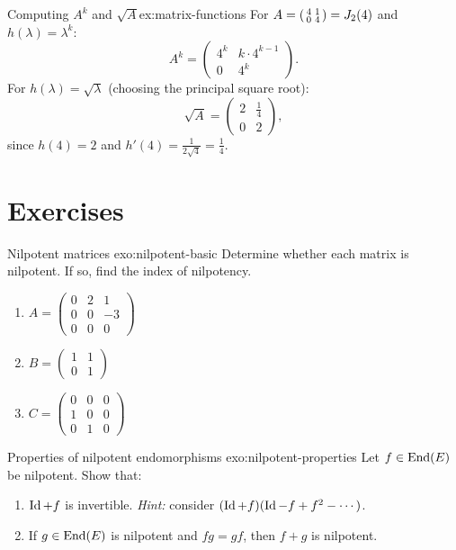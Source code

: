 \begin{example}{Computing $A^k$ and $\sqrt{A}$}{ex:matrix-functions}
For $A = \begin{psmallmatrix} 4 & 1 \\ 0 & 4 \end{psmallmatrix}
= J_2(4)$ and $h(\lambda) = \lambda^k$:
\[
  A^k = \begin{pmatrix} 4^k & k\cdot 4^{k-1} \\ 0 & 4^k
  \end{pmatrix}.
\]
For $h(\lambda) = \sqrt{\lambda}$ (choosing the principal square root):
\[
  \sqrt{A} = \begin{pmatrix} 2 & \tfrac{1}{4} \\ 0 & 2
  \end{pmatrix},
\]
since $h(4) = 2$ and $h'(4) = \frac{1}{2\sqrt{4}} = \frac{1}{4}$.
\end{example}


\section{Exercises}\label{sec:jordan-exercises}

\begin{exercise}{Nilpotent matrices \basic}{exo:nilpotent-basic}
Determine whether each matrix is nilpotent.  If so, find the index of
nilpotency.
\begin{enumerate}[label=(\alph*)]
  \item $A = \begin{pmatrix} 0 & 2 & 1 \\ 0 & 0 & -3 \\ 0 & 0 & 0
    \end{pmatrix}$
  \item $B = \begin{pmatrix} 1 & 1 \\ 0 & 1 \end{pmatrix}$
  \item $C = \begin{pmatrix} 0 & 0 & 0 \\ 1 & 0 & 0 \\ 0 & 1 & 0
    \end{pmatrix}$
\end{enumerate}
\end{exercise}

\begin{exercise}{Properties of nilpotent endomorphisms \basic}%
{exo:nilpotent-properties}
Let $f \in \operatorname{End}(E)$ be nilpotent.  Show that:
\begin{enumerate}[label=(\alph*)]
  \item $\operatorname{Id} + f$ is invertible.
    \emph{Hint:} consider $(\operatorname{Id} + f)(\operatorname{Id} - f + f^2 - \cdots)$.
  \item If $g \in \operatorname{End}(E)$ is nilpotent and $fg = gf$, then $f + g$
    is nilpotent.
\end{enumerate}
\end{exercise}


